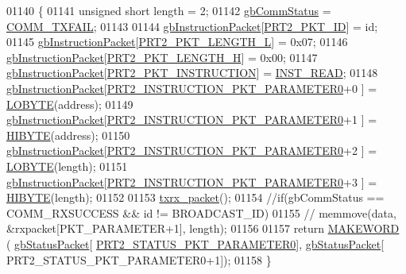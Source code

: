 \begin{DoxyCode}
01140 \{
01141     \textcolor{keywordtype}{unsigned} \textcolor{keywordtype}{short} length = 2;
01142     \hyperlink{classdynamixel2_a703e327ba8ec5909c238dc94a00cb32d}{gbCommStatus} = \hyperlink{dynamixel_8h_af88390c8be18c4079e65fd07b8d553be}{COMM\_TXFAIL}; 
01143 
01144     \hyperlink{classdynamixel2_a298efe9115fdbf77019af1001e801fb4}{gbInstructionPacket}[\hyperlink{dynamixel_8h_a3524b007f8f56ad0d80c1d0caf7e968a}{PRT2\_PKT\_ID}]                      = id;
01145     \hyperlink{classdynamixel2_a298efe9115fdbf77019af1001e801fb4}{gbInstructionPacket}[\hyperlink{dynamixel_8h_a9e77ab568957b64786c810967dec8b0c}{PRT2\_PKT\_LENGTH\_L}]                  = 0x07;
01146     \hyperlink{classdynamixel2_a298efe9115fdbf77019af1001e801fb4}{gbInstructionPacket}[\hyperlink{dynamixel_8h_a5ea18a21d722bf72217d5408c4d2a868}{PRT2\_PKT\_LENGTH\_H}]                  = 0x00;
01147     \hyperlink{classdynamixel2_a298efe9115fdbf77019af1001e801fb4}{gbInstructionPacket}[\hyperlink{dynamixel_8h_aece9dd9d7c0fa1714d53c568865d79ad}{PRT2\_PKT\_INSTRUCTION}]                = 
      \hyperlink{dynamixel_8h_a60599b6587736bb05efb8ea3c5e5f87f}{INST\_READ};
01148     \hyperlink{classdynamixel2_a298efe9115fdbf77019af1001e801fb4}{gbInstructionPacket}[\hyperlink{dynamixel_8h_a349ccb89ae957bdcc16856ec8e2dcb00}{PRT2\_INSTRUCTION\_PKT\_PARAMETER0}+0
      ]    = \hyperlink{dynamixel_8h_a04c0416272e5c07bdf955d803a21688e}{LOBYTE}(address);
01149     \hyperlink{classdynamixel2_a298efe9115fdbf77019af1001e801fb4}{gbInstructionPacket}[\hyperlink{dynamixel_8h_a349ccb89ae957bdcc16856ec8e2dcb00}{PRT2\_INSTRUCTION\_PKT\_PARAMETER0}+1
      ]    = \hyperlink{dynamixel_8h_a75c5b5f21e837e80c0feb4da9a421f87}{HIBYTE}(address);
01150     \hyperlink{classdynamixel2_a298efe9115fdbf77019af1001e801fb4}{gbInstructionPacket}[\hyperlink{dynamixel_8h_a349ccb89ae957bdcc16856ec8e2dcb00}{PRT2\_INSTRUCTION\_PKT\_PARAMETER0}+2
      ]    = \hyperlink{dynamixel_8h_a04c0416272e5c07bdf955d803a21688e}{LOBYTE}(length);
01151     \hyperlink{classdynamixel2_a298efe9115fdbf77019af1001e801fb4}{gbInstructionPacket}[\hyperlink{dynamixel_8h_a349ccb89ae957bdcc16856ec8e2dcb00}{PRT2\_INSTRUCTION\_PKT\_PARAMETER0}+3
      ]    = \hyperlink{dynamixel_8h_a75c5b5f21e837e80c0feb4da9a421f87}{HIBYTE}(length);
01152 
01153     \hyperlink{classdynamixel2_a2cccd455a52afe99a37b249aa834cdc7}{txrx\_packet}();
01154     \textcolor{comment}{//if(gbCommStatus == COMM\_RXSUCCESS && id != BROADCAST\_ID)}
01155     \textcolor{comment}{//  memmove(data, &rxpacket[PKT\_PARAMETER+1], length);}
01156 
01157     \textcolor{keywordflow}{return} \hyperlink{dynamixel_8h_a6b98c16b8e3e7733dd4063d0b0fac24c}{MAKEWORD} ( \hyperlink{classdynamixel2_a0776f210a190cf57d1a6faf9697a593d}{gbStatusPacket}[
      \hyperlink{dynamixel_8h_a7c79167a35ad785b57c7c8de66c59e5c}{PRT2\_STATUS\_PKT\_PARAMETER0}], \hyperlink{classdynamixel2_a0776f210a190cf57d1a6faf9697a593d}{gbStatusPacket}[
      PRT2\_STATUS\_PKT\_PARAMETER0+1]);
01158 \}
\end{DoxyCode}
\hypertarget{classdynamixel2_a674ea4cce4a1f807c0749ac7eb685cd6}{}

